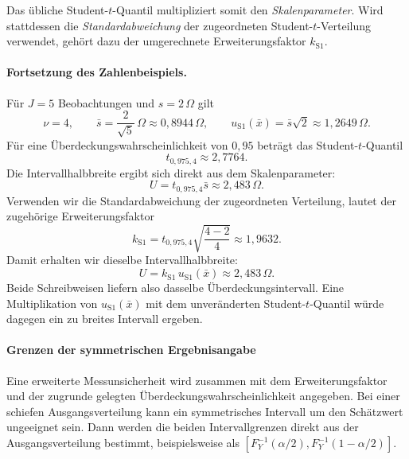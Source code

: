 Das übliche Student-$t$-Quantil multipliziert somit den
\emph{Skalenparameter}. Wird stattdessen die
\emph{Standardabweichung} der zugeordneten Student-$t$-Verteilung
verwendet, gehört dazu der umgerechnete Erweiterungsfaktor
$k_{\mathrm{S1}}$.

\paragraph{Fortsetzung des Zahlenbeispiels.}

Für $J=5$ Beobachtungen und $s=2\,\Omega$ gilt
\begin{equation}
\nu=4,
\qquad
\bar s=\frac{2}{\sqrt5}\,\Omega
\approx0{,}8944\,\Omega,
\qquad
u_{\mathrm{S1}}(\bar x)
=
\bar s\sqrt2
\approx1{,}2649\,\Omega.
\end{equation}
Für eine Überdeckungswahrscheinlichkeit von $0{,}95$ beträgt
das Student-$t$-Quantil
\begin{equation}
t_{0{,}975,4}\approx2{,}7764.
\end{equation}
Die Intervallhalbbreite ergibt sich direkt aus dem Skalenparameter:
\begin{equation}
U
=
t_{0{,}975,4}\bar s
\approx2{,}483\,\Omega.
\end{equation}
Verwenden wir die Standardabweichung der zugeordneten Verteilung,
lautet der zugehörige Erweiterungsfaktor
\begin{equation}
k_{\mathrm{S1}}
=
t_{0{,}975,4}\sqrt{\frac{4-2}{4}}
\approx1{,}9632.
\end{equation}
Damit erhalten wir dieselbe Intervallhalbbreite:
\begin{equation}
U
=
k_{\mathrm{S1}}\,u_{\mathrm{S1}}(\bar x)
\approx2{,}483\,\Omega.
\end{equation}
Beide Schreibweisen liefern also dasselbe Überdeckungsintervall.
Eine Multiplikation von $u_{\mathrm{S1}}(\bar x)$ mit dem
unveränderten Student-$t$-Quantil würde dagegen ein zu breites
Intervall ergeben.

\paragraph{Grenzen der symmetrischen Ergebnisangabe}

Eine erweiterte Messunsicherheit wird zusammen mit dem Erweiterungsfaktor
und der zugrunde gelegten Überdeckungswahrscheinlichkeit angegeben.
Bei einer schiefen Ausgangsverteilung kann ein symmetrisches Intervall
um den Schätzwert ungeeignet sein. Dann werden die beiden Intervallgrenzen
direkt aus der Ausgangsverteilung bestimmt, beispielsweise als
$[F_Y^{-1}(\alpha/2),F_Y^{-1}(1-\alpha/2)]$.

